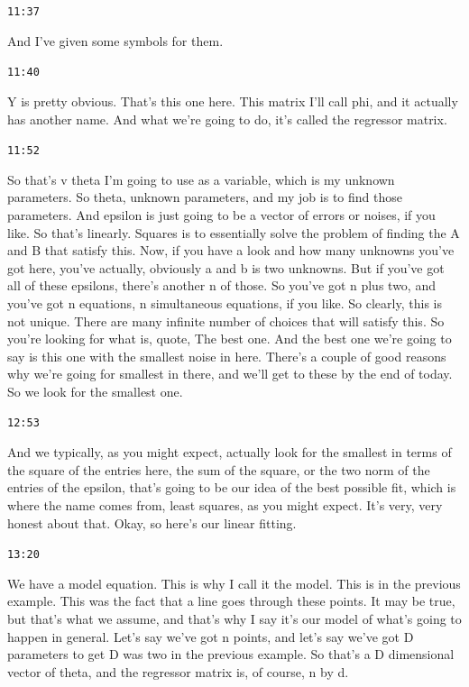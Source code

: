 \documentclass[11pt,a4paper]{article}
\newcommand{\timestamp}[1]{%
  \par\vspace{0.35em}%
  \noindent\colorbox{timestampback}{\textcolor{timestampblue}{\small\texttt{#1}}}%
  \par\vspace{0.2em}%
}
\begin{document}
\timestamp{11:37}

And I've given some symbols for them.



\timestamp{11:40}

Y is pretty obvious. That's this one here. This matrix I'll call phi, and it actually has another name. And what we're going to do, it's called the regressor matrix.



\timestamp{11:52}

So that's v theta I'm going to use as a variable, which is my unknown parameters. So theta, unknown parameters, and my job is to find those parameters. And epsilon is just going to be a vector of errors or noises, if you like. So that's linearly. Squares is to essentially solve the problem of finding the A and B that satisfy this. Now, if you have a look and how many unknowns you've got here, you've actually, obviously a and b is two unknowns. But if you've got all of these epsilons, there's another n of those. So you've got n plus two, and you've got n equations, n simultaneous equations, if you like. So clearly, this is not unique. There are many infinite number of choices that will satisfy this. So you're looking for what is, quote, The best one. And the best one we're going to say is this one with the smallest noise in here. There's a couple of good reasons why we're going for smallest in there, and we'll get to these by the end of today. So we look for the smallest one.



\timestamp{12:53}

And we typically, as you might expect, actually look for the smallest in terms of the square of the entries here, the sum of the square, or the two norm of the entries of the epsilon, that's going to be our idea of the best possible fit, which is where the name comes from, least squares, as you might expect. It's very, very honest about that. Okay, so here's our linear fitting.



\timestamp{13:20}

We have a model equation. This is why I call it the model. This is in the previous example. This was the fact that a line goes through these points. It may be true, but that's what we assume, and that's why I say it's our model of what's going to happen in general. Let's say we've got n points, and let's say we've got D parameters to get D was two in the previous example. So that's a D dimensional vector of theta, and the regressor matrix is, of course, n by d.
\end{document}
